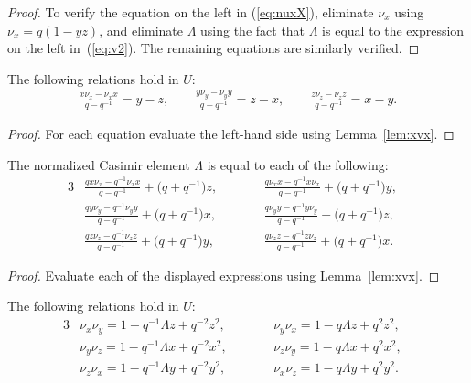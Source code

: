 \begin{proof}
To
verify the equation on
the left in
(\ref{eq:nuxX}), eliminate
$\nu_x$ using $\nu_x = q(1-yz)$, and eliminate
$\Lambda$
using the fact that $\Lambda$ is equal to
the expression on the left in~(\ref{eq:v2}).
 The remaining equations are
similarly verif\/ied.
\end{proof}


\begin{Lemma}
\label{lem:xnxcom}
The following relations hold in
$U$:
\begin{gather*}
\frac{x\nu_x-\nu_x x}{q-q^{-1}}  =  y-z,
\qquad
\frac{y\nu_y-\nu_y y}{q-q^{-1}}  =  z-x,
\qquad
\frac{z\nu_z-\nu_z z}{q-q^{-1}}  =  x-y.
\end{gather*}
\end{Lemma}

\begin{proof}
For each equation evaluate the left-hand side
using
Lemma~\ref{lem:xvx}.
\end{proof}




\begin{Lemma}
The normalized Casimir element $\Lambda$ is equal
to each of the following:
\begin{alignat}{3}
&\frac{qx \nu_x - q^{-1}\nu_x x}{q-q^{-1}}+\big(q+q^{-1}\big)z,
\qquad &&
\frac{q \nu_x x - q^{-1}x\nu_x}{q-q^{-1}}+\big(q+q^{-1}\big)y,&
\label{eq:dcas1}
\\
&\frac{qy \nu_y - q^{-1}\nu_y y}{q-q^{-1}}+\big(q+q^{-1}\big)x,
\qquad &&
\frac{q \nu_y y - q^{-1}y\nu_y}{q-q^{-1}}+\big(q+q^{-1}\big)z, &
\label{eq:dcas2}
\\
& \frac{qz \nu_z - q^{-1}\nu_z z}{q-q^{-1}}+\big(q+q^{-1}\big)y,
\qquad &&
\frac{q \nu_z z - q^{-1}z\nu_z}{q-q^{-1}}+\big(q+q^{-1}\big)x.&
\label{eq:dcas3}
\end{alignat}
\end{Lemma}

\begin{proof}
Evaluate each of the displayed expressions
using
Lemma~\ref{lem:xvx}.
\end{proof}

\begin{Lemma}
\label{lem:nxny}
The following relations hold in
$U$:
\begin{alignat}{3}
& \nu_x \nu_y = 1- q^{-1}\Lambda z + q^{-2} z^2,
\qquad &&
\nu_y \nu_x = 1- q\Lambda z + q^2 z^2,&
\label{eq:nxny1}
\\
& \nu_y \nu_z = 1- q^{-1}\Lambda x + q^{-2} x^2,
\qquad &&
\nu_z \nu_y = 1- q\Lambda x + q^2 x^2,&
\label{eq:nxny2}
\\
& \nu_z \nu_x = 1- q^{-1}\Lambda y + q^{-2} y^2,
\qquad &&
\nu_x \nu_z = 1- q\Lambda y + q^2 y^2.&
\label{eq:nxny3}
\end{alignat}
\end{Lemma}

